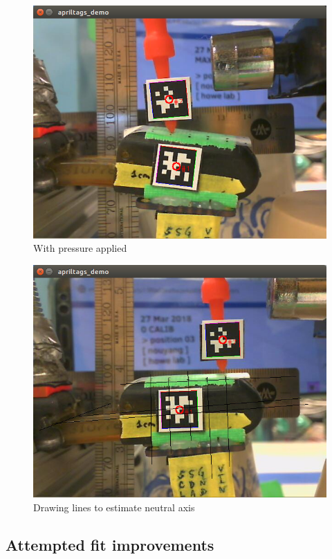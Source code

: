 \documentclass[12pt]{article}
\begin{document}
\begin{figure}[H]
\centering
\includegraphics[width=.3\textwidth]{images/1d/weighted.png}
\caption{With pressure applied}
\end{figure}

\begin{figure}[H]
\centering
\includegraphics[width=.3\textwidth]{images/1d/torque_calc.jpg}
\caption{Drawing lines to estimate neutral axis}
\end{figure}

\subsection{Attempted fit improvements}



\end{document}
